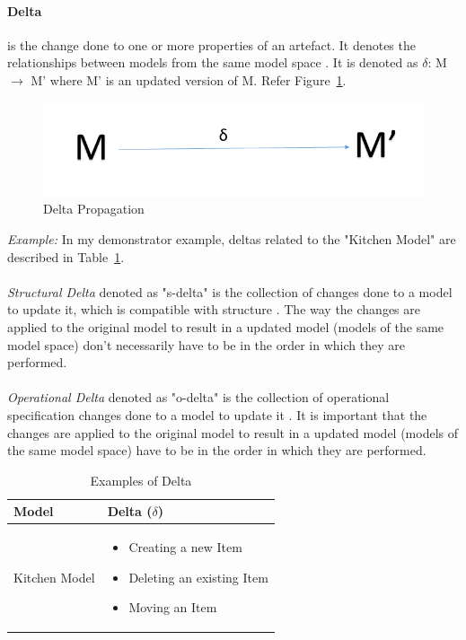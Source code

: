 \paragraph{Delta} is the change done to one or more properties of an artefact. It denotes the relationships between models from the same model space \cite{benchmarx-reload}. 
It is denoted as $\delta$: M $\longrightarrow$ M' where M' is an updated version of M. Refer Figure~\ref{fig:Delta_Propagation}.
\begin{figure}
	\includegraphics[width=1\textwidth]{figures/Delta}
	\caption{Delta Propagation}
	\label{fig:Delta_Propagation}
\end{figure}
\newline\newline\textit{Example:} In my demonstrator example, deltas related to the "Kitchen Model" are described in Table~\ref{tab:Examples of Delta}. 
\\\\\textit{Structural Delta} denoted as "s-delta" is the collection of changes done to a model to update it, which is compatible with structure \cite{benchmarx-reload}. The way the changes are applied to the original model to result in a updated model (models of the same model space) don't necessarily have to be in the order in which they are performed. 
\\\\\textit{Operational Delta} denoted as "o-delta" is the collection of operational specification changes done to a model to update it \cite{benchmarx-reload}. It is important that the changes are applied to the original model to result in a updated model (models of the same model space) have to be in the order in which they are performed. 
\begin{table}
	\centering	
	\begin{tabular}{|p{5cm}|p{10cm}|}
		\hline
		\rowcolor[gray]{.8}	
		\textbf{Model} & \textbf{Delta ($\delta$)} \\
		\hline
		Kitchen Model & 
		\begin{itemize}
			\item Creating a new Item
			\item Deleting an existing Item
			\item Moving an Item
		\end{itemize}\\
		\hline				
		
	\end{tabular}
	\label{tab:Examples of Delta}
	\caption{Examples of Delta}
\end{table}

